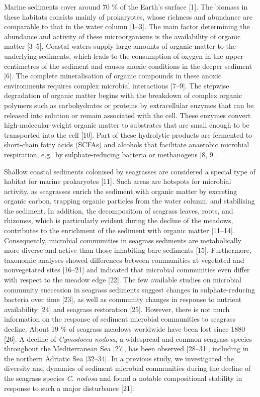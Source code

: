 \documentclass[
  12 pt,
]{article}
\begin{document}
Marine sediments cover around 70 \si{\percent} of the Earth's surface {[}1{]}. The biomass in these habitats consists mainly of prokaryotes, whose richness and abundance are comparable to that in the water column {[}1--3{]}. The main factor determining the abundance and activity of these microorganisms is the availability of organic matter {[}3--5{]}. Coastal waters supply large amounts of organic matter to the underlying sediments, which leads to the consumption of oxygen in the upper centimetres of the sediment and causes anoxic conditions in the deeper sediment {[}6{]}. The complete mineralisation of organic compounds in these anoxic environments requires complex microbial interactions {[}7--9{]}. The stepwise degradation of organic matter begins with the breakdown of complex organic polymers such as carbohydrates or proteins by extracellular enzymes that can be released into solution or remain associated with the cell. These enzymes convert high-molecular-weight organic matter to substrates that are small enough to be transported into the cell {[}10{]}. Part of these hydrolytic products are fermented to short-chain fatty acids (SCFAs) and alcohols that facilitate anaerobic microbial respiration, e.g.~by sulphate-reducing bacteria or methanogens {[}8, 9{]}.

Shallow coastal sediments colonised by seagrasses are considered a special type of habitat for marine prokaryotes {[}11{]}. Such areas are hotspots for microbial activity, as seagrasses enrich the sediment with organic matter by excreting organic carbon, trapping organic particles from the water column, and stabilising the sediment. In addition, the decomposition of seagrass leaves, roots, and rhizomes, which is particularly evident during the decline of the meadows, contributes to the enrichment of the sediment with organic matter {[}11--14{]}. Consequently, microbial communities in seagrass sediments are metabolically more diverse and active than those inhabiting bare sediments {[}15{]}. Furthermore, taxonomic analyses showed differences between communities at vegetated and nonvegetated sites {[}16--21{]} and indicated that microbial communities even differ with respect to the meadow edge {[}22{]}. The few available studies on microbial community succession in seagrass sediments suggest changes in sulphate-reducing bacteria over time {[}23{]}, as well as community changes in response to nutrient availability {[}24{]} and seagrass restoration {[}25{]}. However, there is not much information on the response of sediment microbial communities to seagrass decline. About 19 \si{\percent} of seagrass meadows worldwide have been lost since 1880 {[}26{]}. A decline of \emph{Cymodocea nodosa}, a widespread and common seagrass species throughout the Mediterranean Sea {[}27{]}, has been observed {[}28--31{]}, including in the northern Adriatic Sea {[}32--34{]}. In a previous study, we investigated the diversity and dynamics of sediment microbial communities during the decline of the seagrass species \emph{C. nodosa} and found a notable compositional stability in response to such a major disturbance {[}21{]}.
\end{document}
